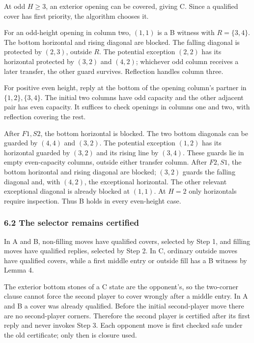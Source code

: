 \documentclass[
  a4paper,
]{article}
\begin{document}
At odd \(H\ge3\), an exterior opening can be covered, giving C. Since a
qualified cover has first priority, the algorithm chooses it.

For an odd-height opening in column two, \((1,1)\) is a B witness with
\(R=\{3,4\}\). The bottom horizontal and rising diagonal are blocked.
The falling diagonal is protected by \((2,3)\), outside \(R\). The
potential exception \((2,2)\) has its horizontal protected by \((3,2)\)
and \((4,2)\); whichever odd column receives a later transfer, the other
guard survives. Reflection handles column three.

For positive even height, reply at the bottom of the opening column's
partner in \(\{1,2\},\{3,4\}\). The initial two columns have odd
capacity and the other adjacent pair has even capacity. It suffices to
check openings in columns one and two, with reflection covering the
rest.

After \(F1,S2\), the bottom horizontal is blocked. The two bottom
diagonals can be guarded by \((4,4)\) and \((3,2)\). The potential
exception \((1,2)\) has its horizontal guarded by \((3,2)\) and its
rising line by \((3,4)\). These guards lie in empty even-capacity
columns, outside either transfer column. After \(F2,S1\), the bottom
horizontal and rising diagonal are blocked; \((3,2)\) guards the falling
diagonal and, with \((4,2)\), the exceptional horizontal. The other
relevant exceptional diagonal is already blocked at \((1,1)\). At
\(H=2\) only horizontals require inspection. Thus B holds in every
even-height case.

\subsubsection{6.2 The selector remains
certified}\label{the-selector-remains-certified}

In A and B, non-filling moves have qualified covers, selected by Step 1,
and filling moves have qualified replies, selected by Step 2. In C,
ordinary outside moves have qualified covers, while a first middle entry
or outside fill has a B witness by Lemma 4.

The exterior bottom stones of a C state are the opponent's, so the
two-corner clause cannot force the second player to cover wrongly after
a middle entry. In A and B a cover was already qualified. Before the
initial second-player move there are no second-player corners. Therefore
the second player is certified after its first reply and never invokes
Step 3. Each opponent move is first checked safe under the old
certificate; only then is closure used.
\end{document}
